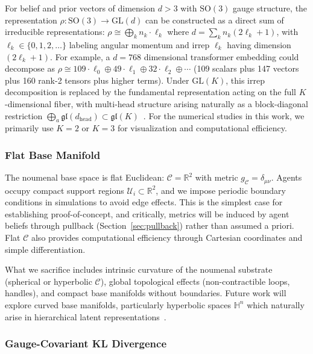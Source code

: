 \documentclass[11pt]{article}
\begin{document}
For belief and prior vectors of dimension $d > 3$ with $\mathrm{SO}(3)$ gauge structure, the representation $\rho: \mathrm{SO}(3) \to \mathrm{GL}(d)$ can be constructed as a direct sum of irreducible representations: $\rho \cong \bigoplus_{k} n_k \cdot \ell_k$ where $d = \sum_{k} n_k(2\ell_k + 1)$, with $\ell_k \in \{0,1,2,\ldots\}$ labeling angular momentum and irrep $\ell_k$ having dimension $(2\ell_k + 1)$. For example, a $d=768$ dimensional transformer embedding could decompose as $\rho \cong 109 \cdot \ell_0 \oplus 49 \cdot \ell_1 \oplus 32 \cdot \ell_2 \oplus \cdots$ (109 scalars plus 147 vectors plus 160 rank-2 tensors plus higher terms). Under $\mathrm{GL}(K)$, this irrep decomposition is replaced by the fundamental representation acting on the full $K$-dimensional fiber, with multi-head structure arising naturally as a block-diagonal restriction $\bigoplus_a \mathfrak{gl}(d_{\mathrm{head}}) \subset \mathfrak{gl}(K)$~\cite{Dennis2026GL}. For the numerical studies in this work, we primarily use $K=2$ or $K=3$ for visualization and computational efficiency.

\subsubsection{Flat Base Manifold}

The noumenal base space is flat Euclidean: $\mathcal{C} = \mathbb{R}^2$ with metric $g_{\mathcal{C}} = \delta_{\mu\nu}$. Agents occupy compact support regions $\mathcal{U}_i \subset \mathbb{R}^2$, and we impose periodic boundary conditions in simulations to avoid edge effects. This is the simplest case for establishing proof-of-concept, and critically, metrics will be induced by agent beliefs through pullback (Section~\ref{sec:pullback}) rather than assumed a priori. Flat $\mathcal{C}$ also provides computational efficiency through Cartesian coordinates and simple differentiation.

What we sacrifice includes intrinsic curvature of the noumenal substrate (spherical or hyperbolic $\mathcal{C}$), global topological effects (non-contractible loops, handles), and compact base manifolds without boundaries. Future work will explore curved base manifolds, particularly hyperbolic spaces $\mathbb{H}^n$ which naturally arise in hierarchical latent representations~\cite{Nickel2017}.


\subsubsection{Gauge-Covariant KL Divergence}
\end{document}
